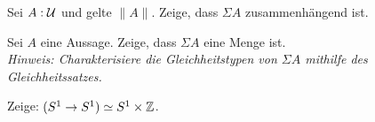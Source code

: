 \documentclass{hott-übung}
\begin{document}
\setcounter{blattnummer}{8}
\setcounter{aufgabennummer}{0}

\blatt

\aufgabe{}
Sei \(A : \mathcal{U}\) und gelte \(\|A\|\).
Zeige, dass \(\Sigma A\) zusammenhängend ist.

\aufgabe{}
Sei \(A\) eine Aussage.
Zeige, dass \(\Sigma A\) eine Menge ist.\\
\emph{Hinweis: Charakterisiere die Gleichheitstypen von \(\Sigma A\) mithilfe des Gleichheitssatzes.}

\aufgabe{}
Zeige: $(S^1\to S^1)\simeq S^1 \times \mathbb{Z}$.\\
\end{document}
